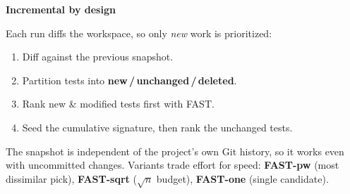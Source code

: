 \documentclass[12pt]{article}
\newcommand{\heading}[1]{%
    {\color{ink}\bfseries\fontsize{36}{40}\selectfont #1}\par
    \vspace{0.05in}{\color{accent}\rule{\linewidth}{2.5pt}}\par
    \vspace{0.12in}%
  }
\newcommand{\tight}{\setlength{\itemsep}{0.10in}\setlength{\topsep}{0.02in}\setlength{\parsep}{0pt}}
\begin{document}
{\vfill

\heading{Incremental by design}
Each run diffs the workspace, so only \emph{new} work is prioritized:
\begin{enumerate}\tight
  \item Diff against the previous snapshot.
  \item Partition tests into \textbf{new\,/\,unchanged\,/\,deleted}.
  \item Rank new \& modified tests first with FAST.
  \item Seed the cumulative signature, then rank the unchanged tests.
\end{enumerate}
The snapshot is independent of the project's own Git history, so it works even with uncommitted changes. Variants trade effort for speed: \textbf{FAST-pw} (most dissimilar pick), \textbf{FAST-sqrt} ($\sqrt{n}$ budget), \textbf{FAST-one} (single candidate).
}%
\hfill
\end{document}
